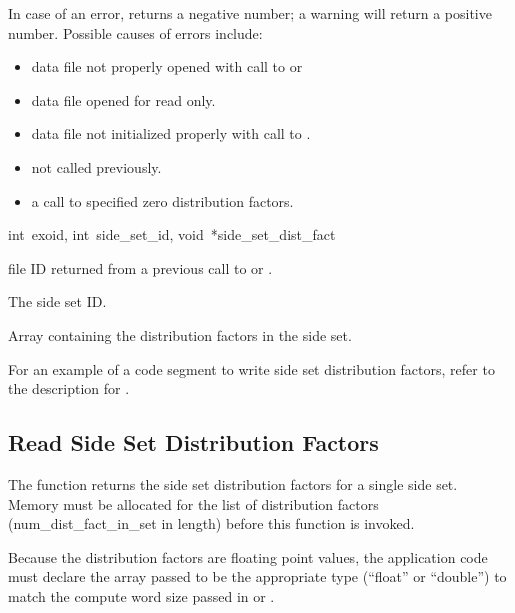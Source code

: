 In case of an error,  returns
a negative number; a warning will return a positive number.
Possible causes of errors include:

\begin{itemize}
 \item data file not properly opened with call to 
 or 

 \item data file opened for read only.

 \item data file not initialized properly with call to
 .

 \item {} not called previously.

 \item a call to  specified zero
 distribution factors.
\end{itemize}


{int~exoid,
int~side_set_id,
void~*side_set_dist_fact}

\begin{parameters}
\item[{int exoid \R{}}]
\exo{} file ID returned from a previous call to 
or .

\item[{int side_set_id \R{}}]
The side set ID.

\item[{void* side_set_dist_fact \R{}}]
Array containing the distribution factors in the side set.
\end{parameters}

For an example of a code segment to write side set distribution
factors, refer to the description for
.




\subsection{Read Side Set Distribution Factors}

The function  returns the side
set distribution factors for a single side set. Memory must be
allocated for the list of distribution factors
({num_dist_fact_in_set} in length) before this function is
invoked.

Because the distribution factors are floating point values, the
application code must declare the array passed to be the appropriate
type (``float'' or ``double'') to match the compute word size passed
in  or .

